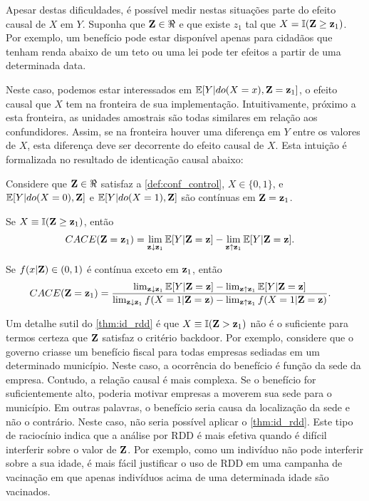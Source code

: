 Apesar destas dificuldades,
é possível medir nestas situações
parte do efeito causal de $X$ em $Y$.
Suponha que ${\mathbf{Z}} \in \Re$ e que 
existe $z_1$ tal que $X = {\mathbb I}({\mathbf{Z}} \geq {\mathbf{z}}_1)$. 
Por exemplo, um benefício pode estar disponível
apenas para cidadãos que tenham renda 
abaixo de um teto ou
uma lei pode ter efeitos
a partir de uma determinada data.

Neste caso, podemos estar interessados em
${\mathbb E}[Y|do(X=x),{\mathbf{Z}}={\mathbf{z}}_1]$, 
o efeito causal que $X$ tem na 
fronteira de sua implementação.
Intuitivamente, próximo a esta fronteira,
as unidades amostrais são todas similares 
em relação aos confundidores.
Assim, se na fronteira houver uma diferença em $Y$ entre
os valores de $X$, esta diferença 
deve ser decorrente do efeito causal de $X$.
Esta intuição é formalizada no resultado de
identicação causal abaixo:

\begin{theorem}
 \label{thm:id_rdd}
 Considere que ${\mathbf{Z}} \in \Re$ satisfaz 
 a \cref{def:conf_control}, $X \in \{0,1\}$, e
 ${\mathbb E}[Y|do(X=0),{\mathbf{Z}}]$ e ${\mathbb E}[Y|do(X=1),{\mathbf{Z}}]$ são 
 contínuas em ${\mathbf{Z}}={\mathbf{z}}_1$.
 
 Se $X \equiv {\mathbb I}({\mathbf{Z}} \geq {\mathbf{z}}_1)$, então
 \begin{align*}
  {CACE}({\mathbf{Z}}={\mathbf{z}}_1)
  &= \lim_{{\mathbf{z}} \downarrow {\mathbf{z}}_1} {\mathbb E}[Y|{\mathbf{Z}} = {\mathbf{z}}] 
  - \lim_{{\mathbf{z}} \uparrow {\mathbf{z}}_1} {\mathbb E}[Y|{\mathbf{Z}} = {\mathbf{z}}].
 \end{align*}
 
 Se $f(x|{\mathbf{Z}}) \in (0,1)$ é contínua exceto em ${\mathbf{z}}_1$, então
 \begin{align*}
  {CACE}({\mathbf{Z}}={\mathbf{z}}_1)
  &= \frac{\lim_{{\mathbf{z}} \downarrow {\mathbf{z}}_1} {\mathbb E}[Y|{\mathbf{Z}} = {\mathbf{z}}] 
  - \lim_{{\mathbf{z}} \uparrow {\mathbf{z}}_1} {\mathbb E}[Y|{\mathbf{Z}} = {\mathbf{z}}]}
  {\lim_{{\mathbf{z}} \downarrow {\mathbf{z}}_1} f(X=1|{\mathbf{Z}}={\mathbf{z}}) 
  - \lim_{{\mathbf{z}} \uparrow {\mathbf{z}}_1} f(X=1|{\mathbf{Z}}={\mathbf{z}})}.
 \end{align*}
\end{theorem}

Um detalhe sutil do \cref{thm:id_rdd} é que
$X \equiv {\mathbb I}({\mathbf{Z}} > {\mathbf{z}}_1)$ não é
o suficiente para termos certeza que
${\mathbf{Z}}$ satisfaz o critério backdoor.
Por exemplo, considere que 
o governo criasse um benefício fiscal para
todas empresas sediadas em um determinado município.
Neste caso, a ocorrência do benefício é
função da sede da empresa. 
Contudo, a relação causal é mais complexa.
Se o benefício for suficientemente alto,
poderia motivar empresas a 
moverem sua sede para o município.
Em outras palavras, 
o benefício seria causa da localização da sede e não o contrário.
Neste caso, não seria possível aplicar o \cref{thm:id_rdd}.
Este tipo de raciocínio indica que a análise por RDD é
mais efetiva quando é difícil interferir sobre o valor de ${\mathbf{Z}}$.
Por exemplo, como um indivíduo não pode interferir sobre a sua idade,
é mais fácil justificar o uso de RDD em
uma campanha de vacinação em que
apenas indivíduos acima de uma determinada idade são vacinados.

